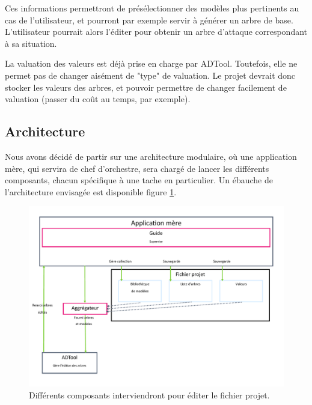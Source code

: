         Ces informations permettront de présélectionner des modèles plus pertinents au cas de l'utilisateur, et pourront par exemple servir à générer un arbre de base. L'utilisateur pourrait alors l'éditer pour obtenir un arbre d'attaque correspondant à sa situation.

        La valuation des valeurs est déjà prise en charge par ADTool. Toutefois, elle ne permet pas de changer aisément de "type" de valuation. Le projet devrait donc stocker les valeurs des arbres, et pouvoir permettre de changer facilement de valuation (passer du coût au temps, par exemple).
    
    \subsection{Architecture}
        Nous avons décidé de partir sur une architecture modulaire, où une application mère, qui servira de chef d'orchestre, sera chargé de lancer les différents composants, chacun spécifique à une tache en particulier. %
        Un ébauche de l'architecture envisagée est disponible figure \ref{fig:archi}.

        \begin{figure}
            \begin{center}
                \includegraphics[width=1\textwidth]{figure/archi.pdf}
            \end{center}
            \caption{Différents composants interviendront pour éditer le fichier projet.}
            \label{fig:archi}
        \end{figure}

